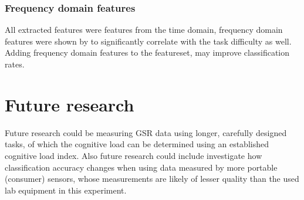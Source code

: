 \documentclass[11pt,leqno,a4paper]{report} %
\begin{document}
\subsubsection{Frequency domain features}
All extracted features were features from the time domain, frequency domain features were shown by \citep{Nourbakhsh2012} to significantly correlate with the task difficulty as well. Adding frequency domain features to the featureset, may improve classification rates.

\section{Future research}
Future research could be measuring GSR data using longer, carefully designed tasks, of which the cognitive load can be determined using an established cognitive load index.
Also future research could include investigate how classification accuracy changes when using data measured by more portable (consumer) sensors, whose measurements are likely of lesser quality than the used lab equipment in this experiment.
 




{}
%
\end{document}
